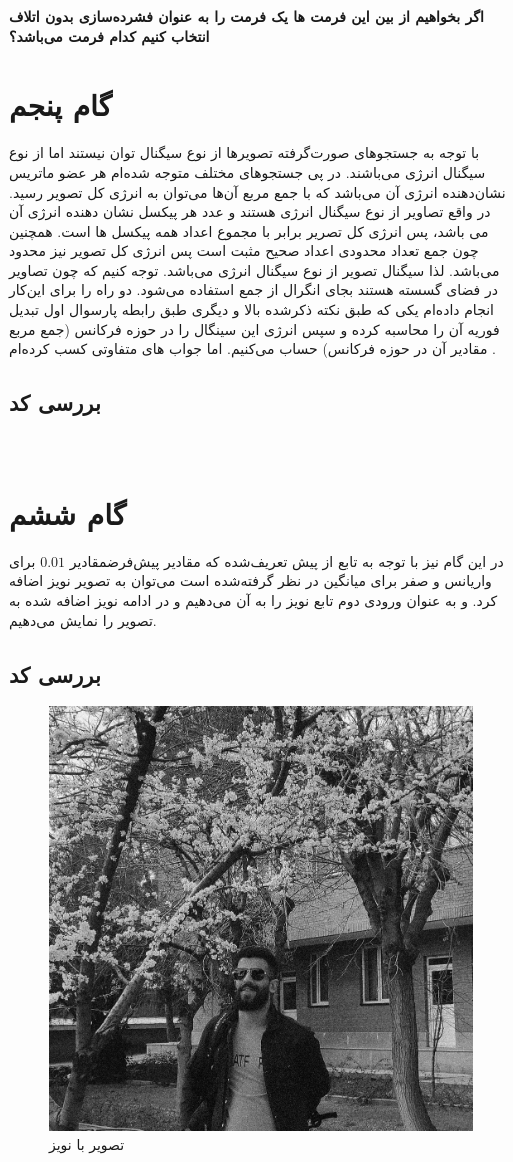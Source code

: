 \textbf{اگر بخواهیم از بین این فرمت ها یک فرمت را به عنوان فشرده‌سازی بدون اتلاف انتخاب کنیم کدام فرمت می‌باشد؟}
\section{گام پنجم}
با توجه به جستجوهای صورت‌گرفته تصویرها از نوع سیگنال توان نیستند اما از نوع سیگنال انرژی می‌باشند.
در پی جستجوهای مختلف 
متوجه شده‌ام هر عضو ماتریس نشان‌دهنده انرژی آن می‌باشد که با جمع مربع آن‌ها می‌توان به انرژی کل تصویر رسید.
در واقع تصاویر از نوع سیگنال انرژی هستند و عدد هر پیکسل نشان دهنده انرژی آن می باشد، پس انرژی کل
تصریر برابر با مجموع اعداد همه پیکسل ها است.
همچنین چون جمع تعداد محدودی اعداد صحیح مثبت است پس انرژی کل تصویر نیز محدود می‌باشد.
لذا سیگنال تصویر از نوع سیگنال انرژی می‌باشد.
توجه کنیم که چون تصاویر در فضای گسسته هستند بجای انگرال از جمع استفاده می‌شود.
دو راه را برای این‌کار انجام داده‌ام یکی که طبق نکته ذکرشده بالا و دیگری 
طبق رابطه پارسوال اول تبدیل فوریه آن را محاسبه کرده و سپس انرژی این سینگال را در حوزه فرکانس
(جمع مربع مقادیر آن در حوزه فرکانس)
حساب می‌کنیم.
اما جواب های متفاوتی کسب کرده‌ام .
\BlankLine
\BlankLine
\BlankLine
\subsection{بررسی کد}
\lr{}
\\
\section{گام ششم}
در این گام نیز با توجه به تابع از پیش تعریف‌شده
که مقادیر پیش‌فرضمقادیر 
 \(0.01\)
برای واریانس و صفر برای میانگین در نظر گرفته‌شده است می‌توان به تصویر نویز اضافه کرد.
و به عنوان ورودی دوم تابع نویز
را به آن می‌دهیم
و در ادامه نویز اضافه شده به تصویر را نمایش می‌دهیم.
\subsection{بررسی کد}
\lr{}
\begin{figure}[H]
    \centering
    \includegraphics[width=0.65\linewidth]{images/noisyImage.jpg}
    \caption{ تصویر با نویز }
    \label{fig:h}
\end{figure}


